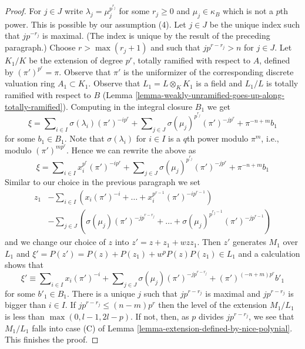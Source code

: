 \documentclass[10pt,a4paper]{amsart}
\theoremstyle{plain}
\theoremstyle{definition}
\theoremstyle{remark}
\numberwithin{equation}{subsection}
\begin{document}
\begin{proof}
\medskip\noindent
For $j \in J$ write $\lambda_j = \mu_j^{p^{r_j}}$ for some $r_j \geq 0$ and
$\mu_j \in \kappa_B$ which is not a $p$th power. This is possible by our
assumption (4). Let $j \in J$ be the unique index such that $j p^{-r_j}$
is maximal. (The index is unique by the result of the preceding paragraph.)
Choose $r > \max(r_j + 1)$ and such that $j p^{r - r_j} > n$ for $j \in J$.
Let $K_1/K$ be the extension of degree $p^r$, totally ramified
with respect to $A$, defined by $(\pi')^{p^r} = \pi$.
Observe that $\pi'$ is the uniformizer of the
corresponding discrete valuation ring $A_1 \subset K_1$.
Observe that $L_1 = L \otimes_K K_1$ is a field and $L_1/L$
is totally ramified with respect to $B$
(Lemma \ref{lemma-weakly-unramified-goes-up-along-totally-ramified}).
Computing in the integral closure $B_1$ we get
$$
\xi = \sum\nolimits_{i \in I} \sigma(\lambda_i) (\pi')^{-i p^r} +
\sum\nolimits_{j \in J} \sigma(\mu_j)^{p^{r_j}} (\pi')^{-j p^r} +
\pi^{-n + m} b_1
$$
for some $b_1 \in B_1$. Note that $\sigma(\lambda_i)$ for $i \in I$
is a $q$th power modulo $\pi^m$, i.e., modulo $(\pi')^{m p^r}$.
Hence we can rewrite the above as
$$
\xi = \sum\nolimits_{i \in I} x_i^{p^r} (\pi')^{-i p^r} +
\sum\nolimits_{j \in J} \sigma(\mu_j)^{p^{r_j}} (\pi')^{- j p^r}
+ \pi^{-n + m}b_1
$$
Similar to our choice in the previous paragraph we set
\begin{align*}
z_1 & - \sum\nolimits_{i \in I}
\left(x_i (\pi')^{-i} + \ldots + x_i^{p^{r - 1}} (\pi')^{-i p^{r - 1}}\right)
\\
& - \sum\nolimits_{j \in J}
\left(
\sigma(\mu_j) (\pi')^{- j p^{r - r_j}}
+ \ldots +
\sigma(\mu_j)^{p^{r_j - 1}} (\pi')^{- j p^{r - 1}}
\right)
\end{align*}
and we change our choice of $z$ into $z' = z + z_1 + wzz_1$.
Then $z'$ generates $M_1$ over $L_1$ and
$\xi' = P(z') = P(z) + P(z_1) + w^p P(z) P(z_1) \in L_1$
and a calculation shows that
$$
\xi' \equiv
\sum\nolimits_{i \in I} x_i (\pi')^{-i} +
\sum\nolimits_{j \in J} \sigma(\mu_j) (\pi')^{- j p^{r - r_j}} +
(\pi')^{(-n + m)p^r}b'_1
$$
for some $b'_1 \in B_1$. There is a unique $j$ such that $j p^{r - r_j}$
is maximal and $j p^{r - r_j}$ is bigger than $i \in I$. If
$j p^{r - r_j} \leq (n - m)p^r$ then the level of the extension $M_1/L_1$
is less than $\max(0, l - 1, 2l - p)$. If not, then, as $p$ divides
$j p^{r - r_j}$, we see that $M_1 / L_1$ falls into case (C) of
Lemma \ref{lemma-extension-defined-by-nice-polynial}.
This finishes the proof.
\end{proof}
\end{document}
